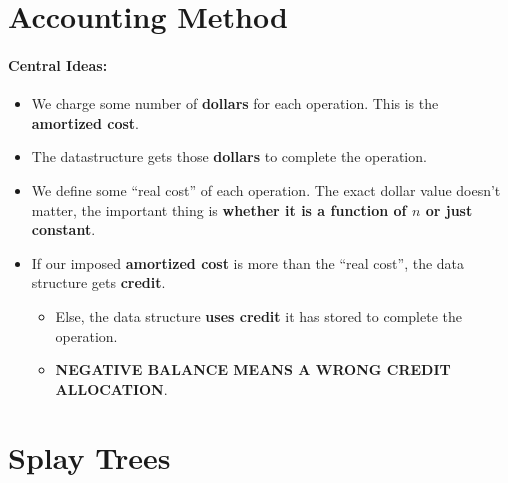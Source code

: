 \documentclass[a4paper,12pt]{report}
\begin{document}
\section{Accounting Method}

\paragraph{Central Ideas:} 
\begin{itemize}
\item We charge some number of \textbf{dollars} for each operation. This is the \textbf{amortized cost}.
\item The datastructure gets those \textbf{dollars} to complete the operation.
\item We define some ``real cost'' of each operation. The exact dollar value doesn't matter, the important thing is \textbf{whether it is a function of $n$ or just constant}.
\item If our imposed \textbf{amortized cost} is more than the ``real cost'', the data structure gets \textbf{credit}.
\begin{itemize}
\item Else, the data structure \textbf{uses credit} it has stored to complete the operation.
\item \textbf{NEGATIVE BALANCE MEANS A WRONG CREDIT ALLOCATION}.
\end{itemize}
\end{itemize}






\section{Splay Trees}
\end{document}
